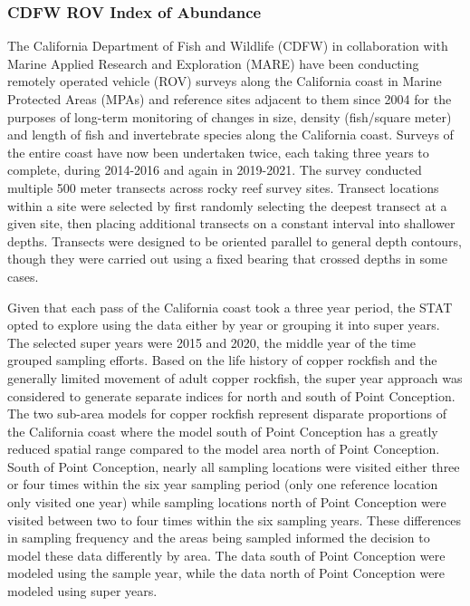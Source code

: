 \documentclass[11pt,
  english,
  letterpaper,
]{article}
\begin{document}
\newpage

\hypertarget{cdfw-rov-index}{%
\subsubsection{CDFW ROV Index of Abundance}\label{cdfw-rov-index}}

The California Department of Fish and Wildlife (CDFW) in collaboration with Marine Applied Research and Exploration (MARE) have been conducting remotely operated vehicle (ROV) surveys along the California coast in Marine Protected Areas (MPAs) and reference sites adjacent to them since 2004 for the purposes of long-term monitoring of changes in size, density (fish/square meter) and length of fish and invertebrate species along the California coast. Surveys of the entire coast have now been undertaken twice, each taking three years to complete, during 2014-2016 and again in 2019-2021. The survey conducted multiple 500 meter transects across rocky reef survey sites. Transect locations within a site were selected by first randomly selecting the deepest transect at a given site, then placing additional transects on a constant interval into shallower depths. Transects were designed to be oriented parallel to general depth contours, though they were carried out using a fixed bearing that crossed depths in some cases.

Given that each pass of the California coast took a three year period, the STAT opted to explore using the data either by year or grouping it into super years. The selected super years were 2015 and 2020, the middle year of the time grouped sampling efforts. Based on the life history of copper rockfish and the generally limited movement of adult copper rockfish, the super year approach was considered to generate separate indices for north and south of Point Conception. The two sub-area models for copper rockfish represent disparate proportions of the California coast where the model south of Point Conception has a greatly reduced spatial range compared to the model area north of Point Conception. South of Point Conception, nearly all sampling locations were visited either three or four times within the six year sampling period (only one reference location only visited one year) while sampling locations north of Point Conception were visited between two to four times within the six sampling years. These differences in sampling frequency and the areas being sampled informed the decision to model these data differently by area. The data south of Point Conception were modeled using the sample year, while the data north of Point Conception were modeled using super years.
\end{document}
